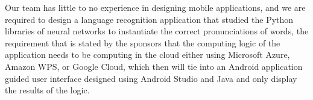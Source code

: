 Our team has little to no experience in designing mobile applications, and we are required to design a language recognition application that studied the Python libraries of neural networks to instantiate the correct pronunciations of words, the requirement that is stated by the sponsors that the computing logic of the application needs to be computing in the cloud either using Microsoft Azure, Amazon WPS, or Google Cloud, which then will tie into an Android application guided user interface
designed using Android Studio and Java and only display the results of the logic.
